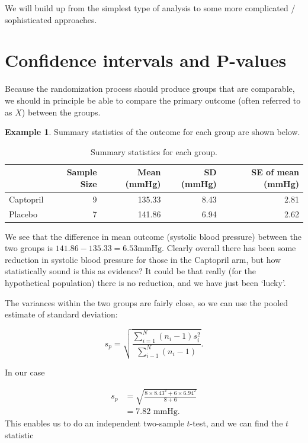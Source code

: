 \documentclass[
  openany]{book}
\theoremstyle{definition}
\theoremstyle{definition}
\newtheorem{example}{Example}[chapter]
\theoremstyle{definition}
\theoremstyle{definition}
\theoremstyle{remark}
\begin{document}
We will build up from the simplest type of analysis to some more complicated / sophisticated approaches.

\hypertarget{ttest}{%
\section{Confidence intervals and P-values}\label{ttest}}

Because the randomization process should produce groups that are comparable, we should in principle be able to compare the primary outcome (often referred to as \(X\)) between the groups.

\begin{example}
\protect\hypertarget{exm:captopril2}{}\label{exm:captopril2}Summary statistics of the outcome for each group are shown below.

\begin{table}

\caption{\label{tab:unnamed-chunk-11}Summary statistics for each group.}
\centering
\begin{tabular}[t]{l|r|r|r|r}
\hline
  & Sample Size & Mean (mmHg) & SD (mmHg) & SE of mean (mmHg)\\
\hline
Captopril & 9 & 135.33 & 8.43 & 2.81\\
\hline
Placebo & 7 & 141.86 & 6.94 & 2.62\\
\hline
\end{tabular}
\end{table}

We see that the difference in mean outcome (systolic blood pressure) between the two groups is \(141.86 - 135.33 = 6.53 \text{mmHg}\). Clearly overall there has been some reduction in systolic blood pressure for those in the Captopril arm, but how statistically sound is this as evidence? It could be that really (for the hypothetical population) there is no reduction, and we have just been `lucky'.

The variances within the two groups are fairly close, so we can use the pooled estimate of standard deviation:

\[
  s_p = \sqrt{\frac{\sum\limits_{i=1}^N\left(n_i-1\right)s_i^2}{\sum\limits_{i-1}^N\left(n_i-1\right)}}.
\]

In our case

\[ 
  \begin{aligned}
s_p&= \sqrt{\frac{8\times{8.43^2} + 6 \times{6.94^2}}{8+6}}\\
& = 7.82\text{ mmHg.}
\end{aligned}
\]
This enables us to do an independent two-sample \(t\)-test, and we can find the \(t\) statistic


\end{example}
\end{document}

